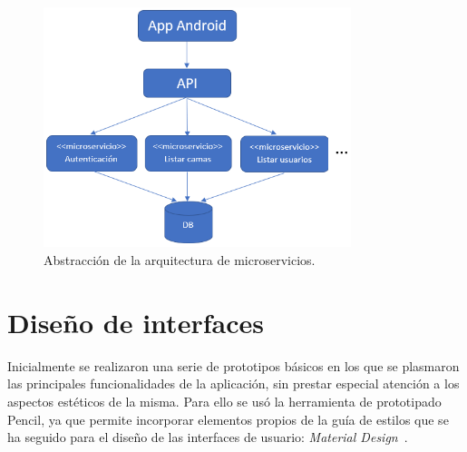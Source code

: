 \begin{figure}[H]
	\centering
	\includegraphics[width=0.8\textwidth]{../img/microservicios.png}
	\caption{Abstracción de la arquitectura de microservicios.}
	\label{fig:microservicios}
\end{figure}

\section{Diseño de interfaces}

Inicialmente se realizaron una serie de prototipos básicos en los que se plasmaron las principales funcionalidades de la aplicación, sin prestar especial atención a los aspectos estéticos de la misma. Para ello se usó la herramienta de prototipado Pencil, ya que permite incorporar elementos propios de la guía de estilos que se ha seguido para el diseño de las interfaces de usuario: \textit{Material Design}~\cite{materialdesign}. 

